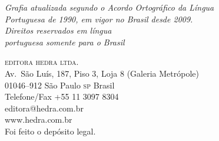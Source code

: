 \vfill

\textit{Grafia atualizada segundo o Acordo Ortográfico da Língua\\
Portuguesa de 1990, em vigor no Brasil desde 2009.}\\

\textit{Direitos reservados em língua\\ 
portuguesa somente para o Brasil}\\\medskip

\textsc{editora hedra ltda.}\\
Av.~São Luís, 187, Piso 3, Loja 8 (Galeria Metrópole)\\
01046--912 São Paulo \textsc{sp} Brasil\\
Telefone/Fax +55 11 3097 8304\\\smallskip
editora@hedra.com.br\\
www.hedra.com.br\\
\bigskip
Foi feito o depósito legal.

\endgroup
\pagebreak